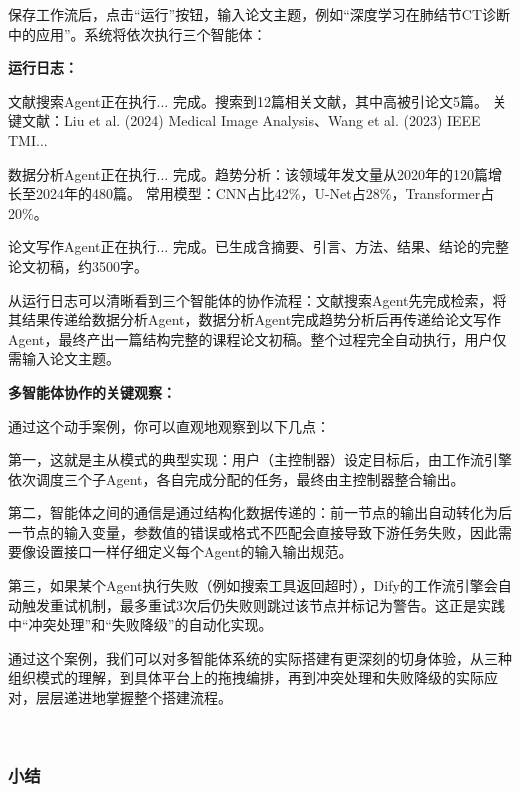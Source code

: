 保存工作流后，点击“运行”按钮，输入论文主题，例如“深度学习在肺结节CT诊断中的应用”。系统将依次执行三个智能体：

\begin{aibox}
\textbf{运行日志：}

文献搜索Agent正在执行... 完成。搜索到12篇相关文献，其中高被引论文5篇。 关键文献：Liu et al. (2024) Medical Image Analysis、Wang et al. (2023) IEEE TMI...

数据分析Agent正在执行... 完成。趋势分析：该领域年发文量从2020年的120篇增长至2024年的480篇。 常用模型：CNN占比42\%，U-Net占28\%，Transformer占20\%。

论文写作Agent正在执行... 完成。已生成含摘要、引言、方法、结果、结论的完整论文初稿，约3500字。
\end{aibox}

从运行日志可以清晰看到三个智能体的协作流程：文献搜索Agent先完成检索，将其结果传递给数据分析Agent，数据分析Agent完成趋势分析后再传递给论文写作Agent，最终产出一篇结构完整的课程论文初稿。整个过程完全自动执行，用户仅需输入论文主题。

\textbf{多智能体协作的关键观察：}

通过这个动手案例，你可以直观地观察到以下几点：

第一，这就是主从模式的典型实现：用户（主控制器）设定目标后，由工作流引擎依次调度三个子Agent，各自完成分配的任务，最终由主控制器整合输出。

第二，智能体之间的通信是通过结构化数据传递的：前一节点的输出自动转化为后一节点的输入变量，参数值的错误或格式不匹配会直接导致下游任务失败，因此需要像设置接口一样仔细定义每个Agent的输入输出规范。

第三，如果某个Agent执行失败（例如搜索工具返回超时），Dify的工作流引擎会自动触发重试机制，最多重试3次后仍失败则跳过该节点并标记为警告。这正是实践中“冲突处理”和“失败降级”的自动化实现。



通过这个案例，我们可以对多智能体系统的实际搭建有更深刻的切身体验，从三种组织模式的理解，到具体平台上的拖拽编排，再到冲突处理和失败降级的实际应对，层层递进地掌握整个搭建流程。






\begin{center}
\textcolor{gray!70}{\*\ \ \*\ \ \*}
\end{center}
\vspace{12pt}



\subsubsection*{小结}

